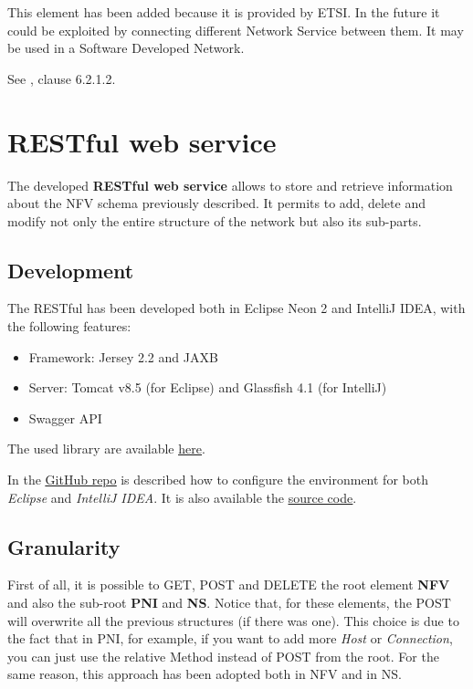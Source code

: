 \documentclass[11pt, english]{article}
\begin{document}
This element has been added because it is provided by ETSI. In the future it could be exploited by connecting different Network Service between them. It may be used in a Software Developed Network.

See \cite{etsi}, clause 6.2.1.2.

\section{RESTful web service}
The developed \textbf{RESTful web service} allows to store and retrieve information about the NFV schema previously described. It permits to add, delete and modify not only the entire structure of the network but also its sub-parts.

\subsection{Development}
The RESTful has been developed both in Eclipse Neon 2 and IntelliJ IDEA, with the following features:
\begin{itemize}
    \item Framework: Jersey 2.2 and JAXB
    \item Server: Tomcat v8.5 (for Eclipse) and Glassfish 4.1 (for IntelliJ)
    \item Swagger API
\end{itemize}

The used library are available  \href{https://github.com/netgroup-polito/nfv-data-model/tree/master/lib}{\underline{here}}.

In the \href{https://github.com/netgroup-polito/nfv-data-model/blob/master/README.md#configuration}{\underline{GitHub repo}} is described how to configure the environment for both \textit{Eclipse} and \textit{IntelliJ IDEA}. It is also available the \href{https://github.com/netgroup-polito/nfv-data-model}{\underline{source code}}. 

\subsection{Granularity}
First of all, it is possible to GET, POST and DELETE the root element \textbf{NFV} and also the sub-root \textbf{PNI} and \textbf{NS}. Notice that, for these elements, the POST will overwrite all the previous structures (if there was one). This choice is due to the fact that in PNI, for example, if you want to add more \textit{Host} or \textit{Connection}, you can just use the relative Method instead of POST from the root. For the same reason, this approach has been adopted both in NFV and in NS.
\end{document}
